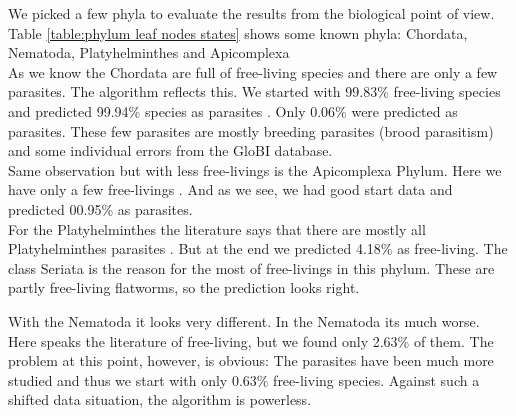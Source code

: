      We picked a few phyla to evaluate the results from the biological point of view. \\
      Table \ref{table:phylum leaf nodes states} shows some known phyla: Chordata, Nematoda, 
        Platyhelminthes and Apicomplexa \\
      As we know  the Chordata are full of free-living species and there are only a 
        few parasites. The algorithm reflects this. We started with 99.83\% free-living species and 
        predicted 99.94\% species as parasites . Only 0.06\% were 
        predicted as parasites. These few parasites are mostly breeding parasites (brood parasitism) and 
        some individual errors from the GloBI database. \\
      Same observation but with less free-livings is the Apicomplexa Phylum. Here we have only a few 
        free-livings . And as we see, we had good start data and predicted 00.95\% as 
        parasites. \\
      For the Platyhelminthes the literature says that there are mostly all Platyhelminthes parasites
        . But at the end we predicted 4.18\% as free-living. The class Seriata is the 
        reason for the most of free-livings in this phylum. These are partly free-living flatworms, so 
        the prediction looks right. \\
      
      With the Nematoda it looks very different.  In the Nematoda its much worse. Here speaks the 
        literature of  free-living, but we found only 2.63\% of them. The problem at 
        this point, however, is obvious: The parasites have been much more studied and thus we start 
        with only 0.63\% free-living species. Against such a shifted data situation, the algorithm is 
        powerless.

